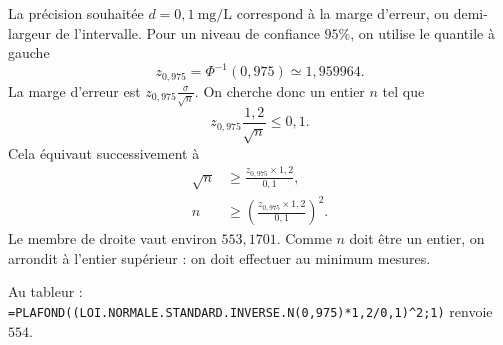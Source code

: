 {\begin{enumerate}
{La précision souhaitée $d=0{,}1\ \mathrm{mg/L}$ correspond à la marge d'erreur, ou demi-largeur de l'intervalle. Pour un niveau de confiance $95\%$, on utilise le quantile à gauche
\[
z_{0{,}975}=\Phi^{-1}(0{,}975)\simeq1{,}959964.
\]
La marge d'erreur est $z_{0{,}975}\frac{\sigma}{\sqrt n}$. On cherche donc un entier $n$ tel que
\[
z_{0{,}975}\frac{1{,}2}{\sqrt n}\leq0{,}1.
\]
Cela équivaut successivement à
\begin{align*}
\sqrt n&\geq\frac{z_{0{,}975}\times1{,}2}{0{,}1},\\
n&\geq\left(\frac{z_{0{,}975}\times1{,}2}{0{,}1}\right)^2.
\end{align*}
Le membre de droite vaut environ $553{,}1701$. Comme $n$ doit être un entier, on arrondit à l'entier supérieur : on doit effectuer au minimum  mesures.

Au tableur : \texttt{=PLAFOND((LOI.NORMALE.STANDARD.INVERSE.N(0,975)*1,2/0,1)\textasciicircum2;1)} renvoie $554$.
}
\end{enumerate}
}
